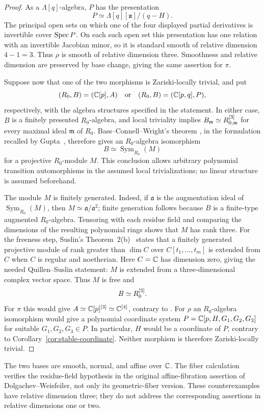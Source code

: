 \begin{proof}
As a $\Lambda[q]$-algebra, $P$ has the presentation
\[
 P\simeq \Lambda[q][\mathbf z]/(q-H).
\]
The principal open sets on which one of the four displayed partial
derivatives is invertible cover $\operatorname{Spec} P$. On each such open set this
presentation has one relation with an invertible Jacobian minor, so it
is standard smooth of relative dimension $4-1=3$. Thus $\rho$ is smooth
of relative dimension three. Smoothness and relative dimension are
preserved by base change, giving the same assertion for $\pi$.

Suppose now that one of the two morphisms is Zariski-locally trivial,
and put
\[
 (R_0,B)=(\mathbb C[p],A)
 \quad\hbox{or}\quad
 (R_0,B)=(\mathbb C[p,q],P),
\]
respectively, with the algebra structures specified in the statement.
In either case, $B$ is a finitely presented $R_0$-algebra, and local triviality
implies
$B_{\mathfrak m}\simeq R_{0,\mathfrak m}^{[3]}$
for every maximal ideal $\mathfrak m$ of $R_0$.
Bass--Connell--Wright's theorem
\cite[Theorem~3(a)]{BassConnellWright}, in the formulation recalled by
Gupta~\cite[Theorem~4.1]{GuptaSurvey}, therefore gives an
$R_0$-algebra isomorphism
\[
 B\simeq\operatorname{Sym}_{R_0}(M)
\]
for a projective $R_0$-module $M$. This conclusion allows arbitrary
polynomial transition automorphisms in the assumed local trivializations;
no linear structure is assumed beforehand.

The module $M$ is finitely generated. Indeed, if $\mathfrak a$ is the
augmentation ideal of $\operatorname{Sym}_{R_0}(M)$, then
$M\simeq\mathfrak a/\mathfrak a^2$; finite generation follows because
$B$ is a finite-type augmented $R_0$-algebra. Tensoring with each residue
field and comparing the dimensions of the resulting polynomial rings
shows that $M$ has rank three. For the freeness step, Suslin's
Theorem~2(b)~\cite{Suslin} states that a finitely generated projective
module of rank greater than $\dim C$ over $C[t_1,\ldots,t_m]$ is extended
from $C$ when $C$ is regular and noetherian. Here $C=\mathbb C$ has dimension
zero, giving the needed Quillen--Suslin statement: $M$ is extended from
a three-dimensional complex vector space.
Thus $M$ is free and
\[
 B\simeq R_0^{[3]}.
\]
For $\pi$ this would give
$A\simeq\mathbb C[p]^{[3]}\simeq\mathbb C^{[4]}$, contrary to .
For $\rho$ an $R_0$-algebra isomorphism would give a polynomial coordinate
system
$P=\mathbb C[p,H,G_1,G_2,G_3]$ for suitable $G_1,G_2,G_3\in P$.
In particular, $H$ would be a coordinate of $P$, contrary to
Corollary~\ref{cor:stable-coordinate}. Neither morphism is therefore
Zariski-locally trivial.
\end{proof}

The two bases are smooth, normal, and affine over $\mathbb C$. The fiber
calculation verifies the residue-field hypothesis in the original
affine-fibration assertion of Dolgachev--Weisfeiler, not only its
geometric-fiber version. These counterexamples have relative dimension
three; they do not address the corresponding assertions in relative
dimensions one or two.

